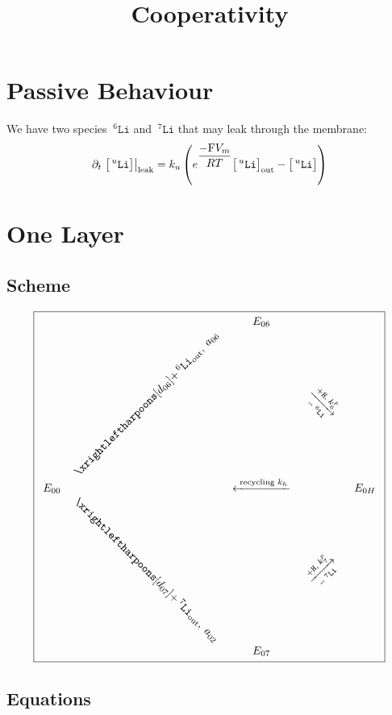 \documentclass[aps,onecolumn,11pt]{revtex4}
\newcommand{\mychem}[1]{\mathtt{#1}}
\newcommand{\myconc}[1]{\big[#1\big]}
\newcommand{\Faraday}{\mathrm{F}}
\newcommand{\spLi}[1]{{\!~^{#1}\mychem{Li}}}
\newcommand{\Li}[1]{\myconc{\spLi{#1}}}
\newcommand{\spproton}{\mychem{H}}
\newcommand{\myleak}[1]{\left.{#1}\right\vert_{\mathrm{leak}}}
\newcommand{\myout}[1]{{#1}_{\tiny\mathrm{out}}}
\newcommand{\LiOut}[1]{\myout{\Li{#1}}}
\newcommand{\spLiOut}[1]{\myout{\spLi{#1}}}
\newcommand{\myrotate}[2]{\rotatebox[origin=c]{#1}{#2}}
\begin{document}
\title{Cooperativity}
\maketitle


\section{Passive Behaviour}
We have two species $\spLi{6}$ and $\spLi{7}$ that may leak through the membrane:
\begin{equation}
	\partial_t \myleak{\Li{u}} = k_u \left( e^{\dfrac{-\Faraday V_m }{RT}} \LiOut{u} - \Li{u}\right)
\end{equation}

\section{One Layer}

\subsection{Scheme}
\begin{equation}
\boxed{
\begin{array}{ccccc}
 & & E_{06}  &  & \\
 &  \myrotate{45}{$\xrightleftharpoons[d_{06}]{+\spLiOut{6},\;a_{06}}$} &   & \myrotate{-45}{$\xrightarrow[-\spLi{6}]{+ \spproton, \; k^p_6}$} &  \\
E_{00}  &  & \xleftarrow{\text{ recycling } k_h } &   & E_{0H} \\
  & \myrotate{-45}{$\xrightleftharpoons[d_{07}]{+\spLiOut{7},\;a_{02}}$} &   & \myrotate{+45}{$\xrightarrow[-\spLi{7}]{+ \spproton, \; k^p_7}$} & \\
 & & E_{07} & & \\
 \end{array}
 }
\end{equation}

\subsection{Equations}
\end{document}
